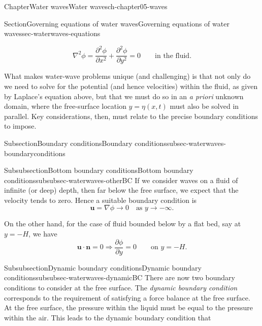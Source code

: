 \documentclass[oneside,10pt,]{book}
\numberwithin{equation}{section}
\newcommand{\pd}[2]{\frac{\partial#1}{\partial#2}}
\newcommand{\bn}{\boldsymbol{n}}
\newcommand{\bu}{\boldsymbol{u}}
\begin{document}
\begin{chapterptx}{Chapter}{Water waves}{}{Water waves}{}{}{ch-chapter05-waves}
\begin{sectionptx}{Section}{Governing equations of water waves}{}{Governing equations of water waves}{}{}{sec-waterwaves-equations}
\begin{introduction}{}
\begin{equation*}
\nabla^2 \phi = \pd{^2 \phi}{x^2} + \pd{^2\phi}{y^2} = 0 \qquad \text{in the fluid}.   
\end{equation*}
%
\par
What makes water-wave problems unique (and challenging) is that not only do we need to solve for the potential (and hence velocities) within the fluid, as given by Laplace's equation above, but that we must do so in an \emph{a priori} unknown domain, where the free-surface location \(y = \eta(x, t)\) must also be solved in parallel. Key considerations, then, must relate to the precise boundary conditions to impose.%
\end{introduction}%
%
%
\typeout{************************************************}
\typeout{************************************************}
%
\begin{subsectionptx}{Subsection}{Boundary conditions}{}{Boundary conditions}{}{}{subsec-waterwaves-boundaryconditions}
%
%
\typeout{************************************************}
\typeout{************************************************}
%
\begin{subsubsectionptx}{Subsubsection}{Bottom boundary conditions}{}{Bottom boundary conditions}{}{}{subsubsec-waterwaves-otherBC}
If we consider waves on a fluid of infinite (or deep) depth, then far below the free surface, we expect that the velocity tends to zero. Hence a suitable boundary condition is%
\begin{equation}
\bu = \nabla \phi \to 0 \quad \text{as $y \to -\infty$}.\label{eqn-waterwaves-farfield-infinite}
\end{equation}
%
\par
On the other hand, for the case of fluid bounded below by a flat bed, say at \(y = -H\), we have%
\begin{equation}
\bu \cdot \bn = 0 \Longrightarrow \pd{\phi}{y} = 0 \qquad \text{on $y = -H$}. \label{eqn-waterwaves-bottom}
\end{equation}
%
\end{subsubsectionptx}
%
%
\typeout{************************************************}
\typeout{************************************************}
%
\begin{subsubsectionptx}{Subsubsection}{Dynamic boundary conditions}{}{Dynamic boundary conditions}{}{}{subsubsec-waterwaves-dynamicBC}
There are now two boundary conditions to consider at the free surface. The \emph{dynamic boundary condition} corresponds to the requirement of satisfying a force balance at the free surface. At the free surface, the pressure within the liquid must be equal to the pressure within the air. This leads to the dynamic boundary condition that%

\end{subsubsectionptx}
\end{subsectionptx}
\end{sectionptx}
\end{chapterptx}
\end{document}
